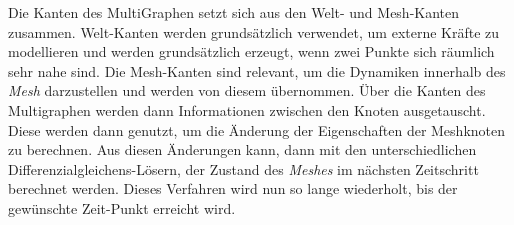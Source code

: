 Die Kanten des MultiGraphen setzt sich aus den Welt- und Mesh-Kanten zusammen.
Welt-Kanten werden grundsätzlich verwendet, um externe Kräfte zu modellieren und werden grundsätzlich erzeugt, 
wenn zwei Punkte sich räumlich sehr nahe sind.
Die Mesh-Kanten sind relevant, um die Dynamiken innerhalb des \textit{Mesh} darzustellen und werden von diesem übernommen.
Über die Kanten des Multigraphen werden dann Informationen zwischen den Knoten ausgetauscht.
Diese werden dann genutzt, um die Änderung der Eigenschaften der Meshknoten zu berechnen.
Aus diesen Änderungen kann, dann mit den unterschiedlichen Differenzialgleichens-Lösern, der Zustand des \textit{Meshes} im nächsten Zeitschritt berechnet werden. 
Dieses Verfahren wird nun so lange wiederholt, bis der gewünschte Zeit-Punkt erreicht wird.









